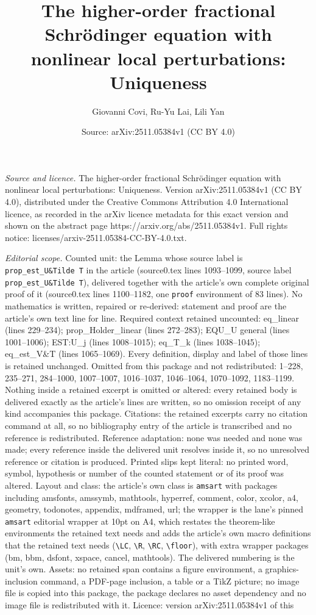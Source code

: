 \documentclass[10pt,a4paper]{amsart}
\title[The higher-order fractional Schr\"odinger equation with nonl]{The higher-order fractional Schr\"odinger equation with nonlinear local perturbations: Uniqueness}
\author{Giovanni Covi, Ru-Yu Lai, Lili Yan}
\date{Source: arXiv:2511.05384v1 (CC BY 4.0)}
\begin{document}
\maketitle

\noindent\emph{Source and licence.} The higher-order fractional Schr\"odinger equation with nonlinear local perturbations: Uniqueness. Version arXiv:2511.05384v1 (CC BY 4.0), distributed under the Creative Commons Attribution 4.0 International licence, as recorded in the arXiv licence metadata for this exact version and shown on the abstract page https://arxiv.org/abs/2511.05384v1. Full rights notice: licenses/arxiv-2511.05384-CC-BY-4.0.txt.\par\smallskip

\noindent\textit{Editorial scope.} Counted unit: the Lemma whose source label is \texttt{prop\_est\_U\&Tilde T} in the article (source0.tex lines 1093--1099, source label \texttt{prop\_est\_U\&Tilde T}), delivered together with the article's own complete original proof of it (source0.tex lines 1100--1182, one \texttt{proof} environment of 83 lines). No mathematics is written, repaired or re-derived: statement and proof are the article's own text line for line. Required context retained uncounted: eq\_linear (lines 229--234); prop\_Holder\_linear (lines 272--283); EQU\_U general (lines 1001--1006); EST:U\_j (lines 1008--1015); eq\_T\_k (lines 1038--1045); eq\_est\_V\&T (lines 1065--1069). Every definition, display and label of those lines is retained unchanged. Omitted from this package and not redistributed: 1--228, 235--271, 284--1000, 1007--1007, 1016--1037, 1046--1064, 1070--1092, 1183--1199. Nothing inside a retained excerpt is omitted or altered: every retained body is delivered exactly as the article's lines are written, so no omission receipt of any kind accompanies this package. Citations: the retained excerpts carry no citation command at all, so no bibliography entry of the article is transcribed and no reference is redistributed. Reference adaptation: none was needed and none was made; every reference inside the delivered unit resolves inside it, so no unresolved reference or citation is produced. Printed slips kept literal: no printed word, symbol, hypothesis or number of the counted statement or of its proof was altered. Layout and class: the article's own class is \texttt{amsart} with packages including amsfonts, amssymb, mathtools, hyperref, comment, color, xcolor, a4, geometry, todonotes, appendix, mdframed, url; the wrapper is the lane's pinned \texttt{amsart} editorial wrapper at 10pt on A4, which restates the theorem-like environments the retained text needs and adds the article's own macro definitions that the retained text needs (\texttt{\textbackslash LC}, \texttt{\textbackslash R}, \texttt{\textbackslash RC}, \texttt{\textbackslash floor}), with extra wrapper packages (bm, bbm, dsfont, xspace, cancel, mathtools). The delivered numbering is the unit's own. Assets: no retained span contains a figure environment, a graphics-inclusion command, a PDF-page inclusion, a table or a TikZ picture; no image file is copied into this package, the package declares no asset dependency and no image file is redistributed with it. Licence: version arXiv:2511.05384v1 of this 
\end{document}
